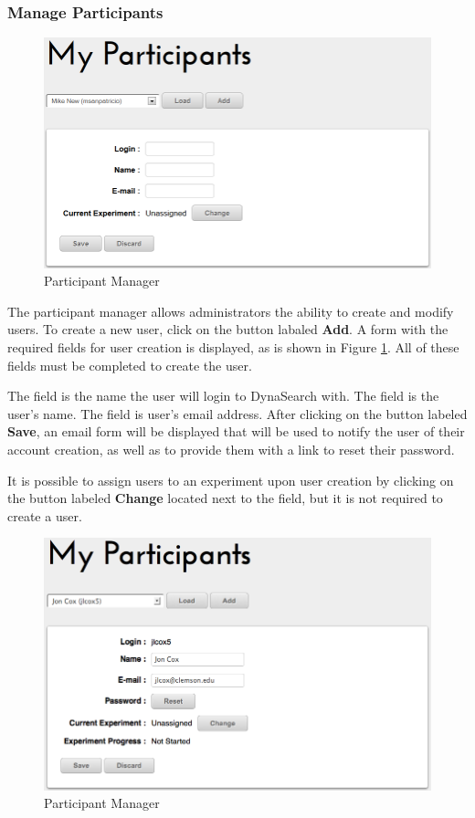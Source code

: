 \documentclass[article]{ij4uq}              %
\begin{document}
\subsubsection {Manage Participants}

\begin{figure}[h!]
 \centering
 \includegraphics[width=5.0in]{figures/manage_participants_new.png}
 \caption{Participant Manager}
 \label{fig:managePartNew}
\end{figure}
\FloatBarrier

The participant manager allows administrators the ability to create and modify users.  To create a new user, click on the button labaled \textbf{Add}.  A form with the required fields for user creation is displayed, as is shown in Figure \ref{fig:managePartNew}.  All of these fields must be completed to create the user.

The  field is the name the user will login to DynaSearch with.  The  field is the user's name. The  field is user's email address.  After clicking on the button labeled \textbf{Save}, an email form will be displayed that will be used to notify the user of their account creation, as well as to provide them with a link to reset their password.

It is possible to assign users to an experiment upon user creation by clicking on the button labeled \textbf{Change} located next to the  field, but it is not required to create a user.

\begin{figure}[h!]
 \centering
 \includegraphics[width=5.0in]{figures/manage_participants.png}
 \caption{Participant Manager}
 \label{fig:managePart}
\end{figure}
\FloatBarrier
\end{document}

